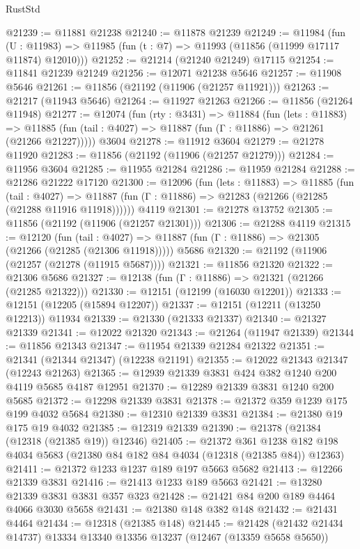 \begin{lexlean}{RustStd}
\begin{coremodule}
@21239 := @11881 @21238
@21240 := @11878 @21239
@21249 := @11984
    (fun (U : @11983) => @11985 (fun (t : @7) => @11993 (@11856 (@11999 @17117 @11874) @12010)))
@21252 := @21214 (@21240 @21249) @17115
@21254 := @11841 @21239 @21249
@21256 := @12071 @21238 @5646
@21257 := @11908 @5646
@21261 := @11856 (@21192 (@11906 (@21257 @11921)))
@21263 := @21217 (@11943 @5646)
@21264 := @11927 @21263
@21266 := @11856 (@21264 @11948)
@21277 := @12074
    (fun (rty : @3431) =>
    @11884
      (fun (lets : @11883) =>
      @11885 (fun (tail : @4027) => @11887 (fun (Γ : @11886) => @21261 (@21266 @21227)))))
    @3604
@21278 := @11912 @3604
@21279 := @21278 @11920
@21283 := @11856 (@21192 (@11906 (@21257 @21279)))
@21284 := @11956 @3604
@21285 := @11955 @21284
@21286 := @11959 @21284
@21288 := @21286 @21222 @17120
@21300 := @12096
    (fun (lets : @11883) =>
    @11885
      (fun (tail : @4027) =>
      @11887 (fun (Γ : @11886) => @21283 (@21266 (@21285 (@21288 @11916 @11918))))))
    @4119
@21301 := @21278 @13752
@21305 := @11856 (@21192 (@11906 (@21257 @21301)))
@21306 := @21288 @4119
@21315 := @12120
    (fun (tail : @4027) => @11887 (fun (Γ : @11886) => @21305 (@21266 (@21285 (@21306 @11918)))))
    @5686
@21320 := @21192 (@11906 (@21257 (@21278 (@11915 @5687))))
@21321 := @11856 @21320
@21322 := @21306 @5686
@21327 := @12138 (fun (Γ : @11886) => @21321 (@21266 (@21285 @21322)))
@21330 := @12151 (@12199 (@16030 @12201))
@21333 := @12151 (@12205 (@15894 @12207))
@21337 := @12151 (@12211 (@13250 @12213)) @11934
@21339 := @21330 (@21333 @21337)
@21340 := @21327 @21339
@21341 := @12022 @21320
@21343 := @21264 (@11947 @21339)
@21344 := @11856 @21343
@21347 := @11954 @21339 @21284 @21322
@21351 := @21341 (@21344 @21347) (@12238 @21191)
@21355 := @12022 @21343 @21347 (@12243 @21263)
@21365 := @12939 @21339 @3831 @424 @382 @1240 @200 @4119 @5685 @4187 @12951
@21370 := @12289 @21339 @3831 @1240 @200 @5685
@21372 := @12298 @21339 @3831
@21378 := @21372 @359 @1239 @175 @199 @4032 @5684
@21380 := @12310 @21339 @3831
@21384 := @21380 @19 @175 @19 @4032
@21385 := @12319 @21339
@21390 := @21378 (@21384 (@12318 (@21385 @19)) @12346)
@21405 := @21372
    @361
    @1238
    @182
    @198
    @4034
    @5683
    (@21380 @84 @182 @84 @4034 (@12318 (@21385 @84)) @12363)
@21411 := @21372 @1233 @1237 @189 @197 @5663 @5682
@21413 := @12266 @21339 @3831
@21416 := @21413 @1233 @189 @5663
@21421 := @13280 @21339 @3831 @3831 @357 @323
@21428 := @21421 @84 @200 @189 @4464 @4066 @3030 @5658
@21431 := @21380 @148 @382 @148
@21432 := @21431 @4464
@21434 := @12318 (@21385 @148)
@21445 := @21428 (@21432 @21434 @14737) @13334 @13340 @13356 @13237 (@12467 (@13359 @5658 @5650))

\end{coremodule}
\end{lexlean}
